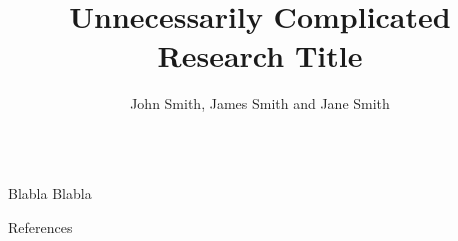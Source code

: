 \documentclass[final]{beamer}
\title{Unnecessarily Complicated Research Title} %
\author{John Smith, James Smith and Jane Smith} %
\institute{Department and University Name} %
\newlength{\onecolwid}
\begin{document}
\begin{frame}[t] 

\begin{columns}[t] 

\begin{column}{\onecolwid} 

Blabla \cite{Smith:2012qr}
Blabla \cite{Smith:2013jd}

\begin{block}{References}




\end{block}

\end{column} %

\end{columns} %

\end{frame} %
\end{document}
